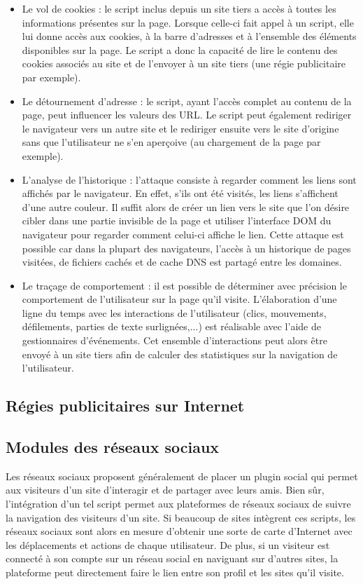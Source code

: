 \begin{itemize}
	\item Le vol de cookies : le script inclus depuis un site tiers a accès à toutes les informations présentes sur la page. Lorsque celle-ci fait appel à un script, elle lui donne accès aux cookies, à la barre d'adresses et à l'ensemble des éléments disponibles sur la page. Le script a donc la capacité de lire le contenu des cookies associés au site et de l'envoyer à un site tiers (une régie publicitaire par exemple).
	\item Le détournement d'adresse : le script, ayant l'accès complet au contenu de la page, peut influencer les valeurs des URL. Le script peut également rediriger le navigateur vers un autre site et le rediriger ensuite vers le site d'origine sans que l'utilisateur ne s'en aperçoive (au chargement de la page par exemple).
	\item L'analyse de l'historique : l'attaque consiste à regarder comment les liens sont affichés par le navigateur. En effet, s'ils ont été visités, les liens s'affichent d'une autre couleur. Il suffit alors de créer un lien vers le site que l'on désire cibler dans une partie invisible de la page et utiliser l'interface DOM du navigateur pour regarder comment celui-ci affiche le lien. Cette attaque est possible car dans la plupart des navigateurs, l'accès à un historique de pages visitées, de fichiers cachés et de cache DNS est partagé entre les domaines.
	\item Le traçage de comportement : il est possible de déterminer avec précision le comportement de l'utilisateur sur la page qu'il visite. L'élaboration d'une ligne du temps avec les interactions de l'utilisateur (clics, mouvements, défilements, parties de texte surlignées,...) est réalisable avec l'aide de gestionnaires d'événements. Cet ensemble d'interactions peut alors être envoyé à un site tiers afin de calculer des statistiques sur la navigation de l'utilisateur.
\end{itemize}

\subsection{Régies publicitaires sur Internet}

\subsection{Modules des réseaux sociaux}
Les réseaux sociaux proposent généralement de placer un plugin social qui permet aux visiteurs d'un site d'interagir et de partager avec leurs amis. Bien sûr, l'intégration d'un tel script permet aux plateformes de réseaux sociaux de suivre la navigation des visiteurs d'un site. Si beaucoup de sites intègrent ces scripts, les réseaux sociaux sont alors en mesure d'obtenir une sorte de carte d'Internet avec les déplacements et actions de chaque utilisateur. De plus, si un visiteur est connecté à son compte sur un réseau social en naviguant sur d'autres sites, la plateforme peut directement faire le lien entre son profil et les sites qu'il visite.

